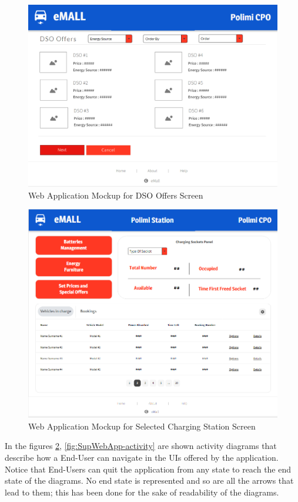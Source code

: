 \documentclass[a4paper]{report}
\begin{document}
\begin{figure}[hp]
\centering
\includegraphics[scale=0.6]{img/mockups/MCKP_DSOoffers.png}
\caption{Web Application Mockup for DSO Offers Screen}
\label{fig:MobileApp-activity}
\end{figure}


\begin{figure}[hp]
\centering
\includegraphics[scale=0.6]{img/mockups/MCKP_SelectedChargingStation.png}
\caption{Web Application Mockup for Selected Charging Station Screen}
\label{fig:MobileApp-activity}
\end{figure}

In the figures \ref{fig:MobileApp-activity}, \ref{fig:SupWebApp-activity}  are shown activity diagrams that describe how a End-User can navigate in the UIs offered by the application. Notice that  End-Users can quit the application from any state to reach the end state of the diagrams. No end state is represented and so are all the arrows that lead to them; this has been done for the sake of readability of the diagrams.
\end{document}
